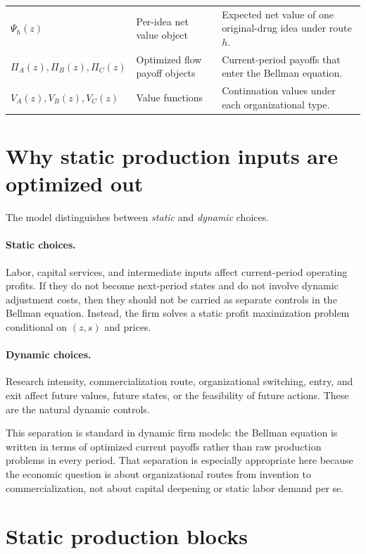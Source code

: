 \documentclass[12pt]{ctexart}
\begin{document}
\begin{longtable}{p{}p{}p{}}
$\Psi_h(z)$ & Per-idea net value object & Expected net value of one original-drug idea under route $h$. \\[0.4em]

$\Pi_A(z),\Pi_B(z),\Pi_C(z)$ & Optimized flow payoff objects & Current-period payoffs that enter the Bellman equation. \\[0.4em]

$V_A(z),V_B(z),V_C(z)$ & Value functions & Continuation values under each organizational type. \\

\bottomrule
\end{longtable}

\section{Why static production inputs are optimized out}

The model distinguishes between \emph{static} and \emph{dynamic} choices.

\paragraph{Static choices.}
Labor, capital services, and intermediate inputs affect current-period operating profits.
If they do not become next-period states and do not involve dynamic adjustment costs, then
they should not be carried as separate controls in the Bellman equation. Instead, the firm
solves a static profit maximization problem conditional on $(z,s)$ and prices.

\paragraph{Dynamic choices.}
Research intensity, commercialization route, organizational switching, entry, and exit affect
future values, future states, or the feasibility of future actions. These are the natural
dynamic controls.

This separation is standard in dynamic firm models: the Bellman equation is written in
terms of optimized current payoffs rather than raw production problems in every period.
That separation is especially appropriate here because the economic question is about
organizational routes from invention to commercialization, not about capital deepening
or static labor demand per se.

\section{Static production blocks}
\end{document}
